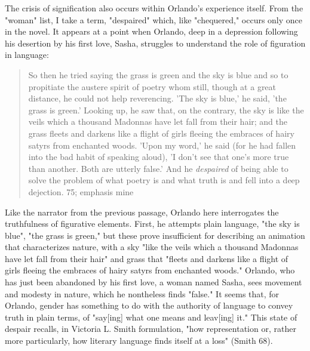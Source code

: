 \documentclass[11pt]{article}
\begin{document}
The crisis of signification also occurs within Orlando's experience
itself. From the "woman" list, I take a term, "despaired" which, like
"chequered," occurs only once in the novel. It appears at a point when
Orlando, deep in a depression following his desertion by his first
love, Sasha, struggles to understand the role of figuration in
language: 
\begin{quote}
So then he tried saying the grass is green and the sky is blue and so
to propitiate the austere spirit of poetry whom still, though at a
great distance, he could not help reverencing. 'The sky is blue,' he
said, 'the grass is green.' Looking up, he saw that, on the contrary,
the sky is like the veils which a thousand Madonnas have let fall from
their hair; and the grass fleets and darkens like a flight of girls
fleeing the embraces of hairy satyrs from enchanted woods. 'Upon my
word,' he said (for he had fallen into the bad habit of speaking
aloud), 'I don't see that one's more true than another. Both are
utterly false.' And he \emph{despaired} of being able to solve the problem
of what poetry is and what truth is and fell into a deep
dejection. 75; emphasis mine
\end{quote}
Like the narrator from the previous passage, Orlando here interrogates
the truthfulness of figurative elements. First, he attempts plain
language, "the sky is blue", "the grass is green," but these prove
insufficient for describing an animation that characterizes nature,
with a sky "like the veils which a thousand Madonnas have let fall
from their hair" and grass that "fleets and darkens like a flight of
girls fleeing the embraces of hairy satyrs from enchanted woods."
Orlando, who has just been abandoned by his first love, a woman named
Sasha, sees movement and modesty in nature, which he nontheless finds
"false." It seems that, for Orlando, gender has something to do with
the authority of language to convey truth in plain terms, of "say[ing]
what one means and leav[ing] it." This state of despair recalls, in
Victoria L. Smith formulation, "how representation or, rather more
particularly, how literary language finds itself at a loss" (Smith
68).
\end{document}
